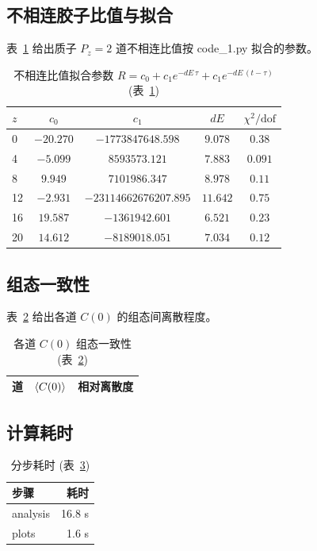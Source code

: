 \documentclass[11pt,a4paper]{article}
\begin{document}
\subsection{不相连胶子比值与拟合}
表~\ref{tab:disc} 给出质子 $P_z=2$ 道不相连比值按 code\_1.py 拟合的参数。
\begin{table}[h]
\centering
\caption{不相连比值拟合参数 $R=c_0+c_1e^{-dE\,\tau}+c_1e^{-dE\,(t-\tau)}$ (表~\ref{tab:disc})}
\label{tab:disc}
\begin{tabular}{lcccc}
\toprule
$z$ & $c_0$ & $c_1$ & $dE$ & $\chi^2/\mathrm{dof}$ \\
\midrule
    0 & $-20.270$ & $-1773847648.598$ & $9.078$ & $0.38$ \\
    4 & $-5.099$ & $8593573.121$ & $7.883$ & $0.091$ \\
    8 & $9.949$ & $7101986.347$ & $8.978$ & $0.11$ \\
    12 & $-2.931$ & $-23114662676207.895$ & $11.642$ & $0.75$ \\
    16 & $19.587$ & $-1361942.601$ & $6.521$ & $0.23$ \\
    20 & $14.612$ & $-8189018.051$ & $7.034$ & $0.12$ \\
\bottomrule
\end{tabular}
\end{table}

\subsection{组态一致性}
表~\ref{tab:config} 给出各道 $C(0)$ 的组态间离散程度。
\begin{table}[h]
\centering
\caption{各道 $C(0)$ 组态一致性 (表~\ref{tab:config})}
\label{tab:config}
\begin{tabular}{lcc}
\toprule
道 & $\braket{C(0)}$ & 相对离散度 \\
\midrule

\bottomrule
\end{tabular}
\end{table}

\subsection{计算耗时}
\begin{table}[h]
\centering
\caption{分步耗时 (表~\ref{tab:timing})}
\label{tab:timing}
\begin{tabular}{lr}
\toprule
步骤 & 耗时 \\
\midrule
    analysis & 16.8 s \\
    plots & 1.6 s \\
\bottomrule
\end{tabular}
\end{table}
\end{document}
